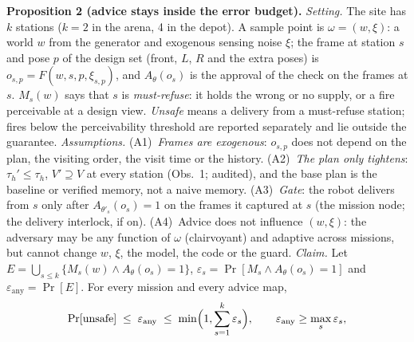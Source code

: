\documentclass[conference]{IEEEtran}
\newcommand{\tauh}{\tau_{h}}
\begin{document}
\textbf{Proposition 2 (advice stays inside the error budget).} \emph{Setting.} The site has $k$ stations ($k=2$ in the arena, 4 in the depot). A sample point is $\omega=(w,\xi)$: a world $w$ from the generator and exogenous sensing noise $\xi$; the frame at station $s$ and pose $p$ of the design set (front, $L$, $R$ and the extra poses) is $o_{s,p}=F(w,s,p,\xi_{s,p})$, and $A_\theta(o_s)$ is the approval of the check on the frames at $s$. $M_s(w)$ says that $s$ is \emph{must-refuse}: it holds the wrong or no supply, or a fire perceivable at a design view. \emph{Unsafe} means a delivery from a must-refuse station; fires below the perceivability threshold are reported separately and lie outside the guarantee.
\emph{Assumptions.} (A1)~\emph{Frames are exogenous}: $o_{s,p}$ does not depend on the plan, the visiting order, the visit time or the history. (A2)~\emph{The plan only tightens}: $\tauh'\le\tauh$, $V'\supseteq V$ at every station (Obs.~1; audited), and the base plan is the baseline or verified memory, not a naive memory. (A3)~\emph{Gate}: the robot delivers from $s$ only after $A_{\theta'_s}(o_s)=1$ on the frames it captured at $s$ (the mission node; the delivery interlock, if on). (A4)~Advice does not influence $(w,\xi)$: the adversary may be any function of $\omega$ (clairvoyant) and adaptive across missions, but cannot change $w$, $\xi$, the model, the code or the guard.
\emph{Claim.} Let $E=\bigcup_{s\le k}\{M_s(w)\wedge A_\theta(o_s)=1\}$, $\varepsilon_s=\Pr[M_s\wedge A_\theta(o_s)=1]$ and $\varepsilon_{\mathrm{any}}=\Pr[E]$. For every mission and every advice map,
\[\Pr[\text{unsafe}]\;\le\;\varepsilon_{\mathrm{any}}\;\le\;\min\Bigl(1,\sum_{s=1}^{k}\varepsilon_s\Bigr),\qquad\varepsilon_{\mathrm{any}}\ge\max_s\varepsilon_s,\]
\end{document}
